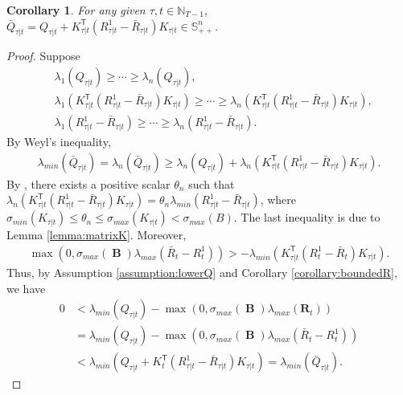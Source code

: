 \documentclass[letterpaper, 10 pt, conference]{ieeeconf}  %
\newcommand{\transpose}{\mathsf{T}}
\DeclareMathOperator{\contB}{\mathbf{B}}
\newtheorem{corollary}{Corollary}
\begin{document}
\begin{corollary}\label{corollary:positiveQ}
    For any given $\tau,t\in\mathbb{N}_{T-1}$, 
       $ \bar{Q}_{\tau|t} = Q_{\tau|t} + K_{\tau|t}^{\transpose}(R_{\tau|t}^{1} - \bar{R}_{\tau|t})K_{\tau|t} \in \mathbb{S}^{n}_{++}$.
\end{corollary}
\begin{proof}
    Suppose
    \begin{align*}
        &\lambda_{1}(Q_{\tau|t}) \geq \cdots \geq \lambda_{n}(Q_{\tau|t}),\\
        &\lambda_{1}(K_{\tau|t}^{\transpose}(R_{\tau|t}^{1} - \bar{R}_{\tau|t})K_{\tau|t}) \geq \cdots \geq \lambda_{n}(K_{\tau|t}^{\transpose}(R_{\tau|t}^{1} - \bar{R}_{\tau|t})K_{\tau|t}),\\
        &\lambda_{1}(R_{\tau|t}^{1} - \bar{R}_{\tau|t}) \geq \cdots \geq \lambda_{n}(R_{\tau|t}^{1} - \bar{R}_{\tau|t}).
    \end{align*}
    By Weyl's inequality,
    \begin{align*}
        \lambda_{min}(\bar{Q}_{\tau|t}) = \lambda_{n}(\bar{Q}_{\tau|t})\geq \lambda_{n}(Q_{\tau|t}) + \lambda_{n}(K_{\tau|t}^{\transpose}(R_{\tau|t}^{1} - \bar{R}_{\tau|t})K_{\tau|t}).
    \end{align*}
    By \cite[Theorem 4.5.9]{horn_matrix_2013}, there exists a positive scalar $\theta_{n}$ such that
        $\lambda_{n}(K_{\tau|t}^{\transpose}(R_{\tau|t}^{1} - \bar{R}_{\tau|t})K_{\tau|t}) = \theta_{n}\lambda_{min}(R_{\tau|t}^{1} - \bar{R}_{\tau|t})$,
    where $\sigma_{min}(K_{\tau|t}) \leq \theta_{n} \leq \sigma_{max}(K_{\tau|t}) < \sigma_{max}(B)$.
    The last inequality is due to Lemma \ref{lemma:matrixK}. 
    Moreover,
    \begin{align*}
        \max(0, \sigma_{max}(\contB)\lambda_{max}(\bar{R}_{t}-R_{t}^{1})) > -\lambda_{min}(K_{\tau|t}^{\transpose}(R_{t}^{1}-\bar{R}_{t})K_{\tau|t}).
    \end{align*}
    Thus, by Assumption \ref{assumption:lowerQ} and Corollary \ref{corollary:boundedR}, we have
    \begin{align*}
    0 &<  \lambda_{min}(Q_{\tau|t}) -\max(0,\sigma_{max}(\contB)\lambda_{max}(\mathbf{R}_{t}))\\
    &=\lambda_{min}(Q_{\tau|t}) - \max(0, \sigma_{max}(\contB)\lambda_{max}(\bar{R}_{t}-R_{t}^{1})) \\
    &< \lambda_{min}(Q_{\tau|t}+K_{t}^{\transpose}(R_{\tau|t}^{1}-\bar{R}_{\tau|t})K_{\tau|t})= \lambda_{min}(\bar{Q}_{\tau|t}).
    \end{align*}

\end{proof}
\end{document}

